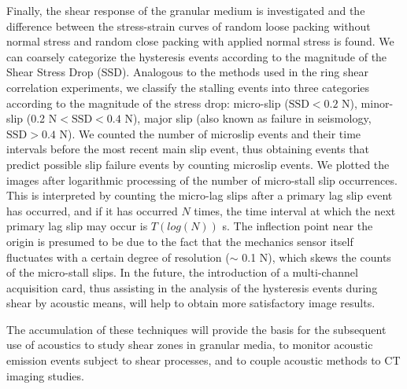 \begin{digest}
    
    Finally, the shear response of the granular medium is investigated and the difference between the stress-strain curves of random loose packing without normal stress and random close packing with applied normal stress is found. We can coarsely categorize the hysteresis events according to the magnitude of the Shear Stress Drop (SSD). Analogous to the methods used in the ring shear correlation experiments, we classify the stalling events into three categories according to the magnitude of the stress drop: micro-slip ($\text{SSD}<0.2$ \unit{\newton}), minor-slip (0.2 \unit{\newton}$<\text{SSD}<0.4$ \unit{ \newton}), major slip (also known as failure in seismology, $\text{SSD}>0.4$ \unit{\newton}).
    We counted the number of microslip events and their time intervals before the most recent main slip event, thus obtaining events that predict possible slip failure events by counting microslip events. We plotted the images after logarithmic processing of the number of micro-stall slip occurrences. This is interpreted by counting the micro-lag slips after a primary lag slip event has occurred, and if it has occurred $N$ times, the time interval at which the next primary lag slip may occur is $T(log{(N)})$ \unit{s}. The inflection point near the origin is presumed to be due to the fact that the mechanics sensor itself fluctuates with a certain degree of resolution ($\sim$ 0.1 \unit{\newton}), which skews the counts of the micro-stall slips. In the future, the introduction of a multi-channel acquisition card, thus assisting in the analysis of the hysteresis events during shear by acoustic means, will help to obtain more satisfactory image results.
    
    The accumulation of these techniques will provide the basis for the subsequent use of acoustics to study shear zones in granular media, to monitor acoustic emission events subject to shear processes, and to couple acoustic methods to CT imaging studies.

\end{digest}
